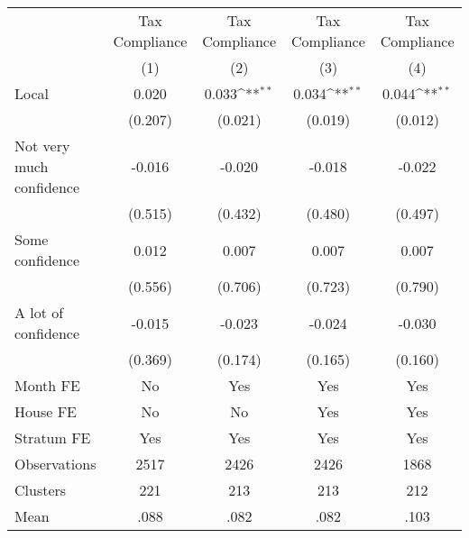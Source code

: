 {
\def\sym#1{\ifmmode^{#1}\else\(^{#1}\)\fi}
\begin{tabular}{l*{4}{c}}
\toprule
                &\multicolumn{1}{c}{Tax Compliance}&\multicolumn{1}{c}{Tax Compliance}&\multicolumn{1}{c}{Tax Compliance}&\multicolumn{1}{c}{Tax Compliance}\\
                &\multicolumn{1}{c}{(1)}         &\multicolumn{1}{c}{(2)}         &\multicolumn{1}{c}{(3)}         &\multicolumn{1}{c}{(4)}         \\
\midrule
Local           &    0.020         &    0.033\sym{**} &    0.034\sym{**} &    0.044\sym{**} \\
                &  (0.207)         &  (0.021)         &  (0.019)         &  (0.012)         \\
Not very much confidence&   -0.016         &   -0.020         &   -0.018         &   -0.022         \\
                &  (0.515)         &  (0.432)         &  (0.480)         &  (0.497)         \\
Some confidence &    0.012         &    0.007         &    0.007         &    0.007         \\
                &  (0.556)         &  (0.706)         &  (0.723)         &  (0.790)         \\
A lot of confidence&   -0.015         &   -0.023         &   -0.024         &   -0.030         \\
                &  (0.369)         &  (0.174)         &  (0.165)         &  (0.160)         \\
Month FE        &       No         &      Yes         &      Yes         &      Yes         \\
House FE        &       No         &       No         &      Yes         &      Yes         \\
Stratum FE      &      Yes         &      Yes         &      Yes         &      Yes         \\
\midrule
Observations    &     2517         &     2426         &     2426         &     1868         \\
Clusters        &      221         &      213         &      213         &      212         \\
Mean            &     .088         &     .082         &     .082         &     .103         \\
\bottomrule
\end{tabular}
}
